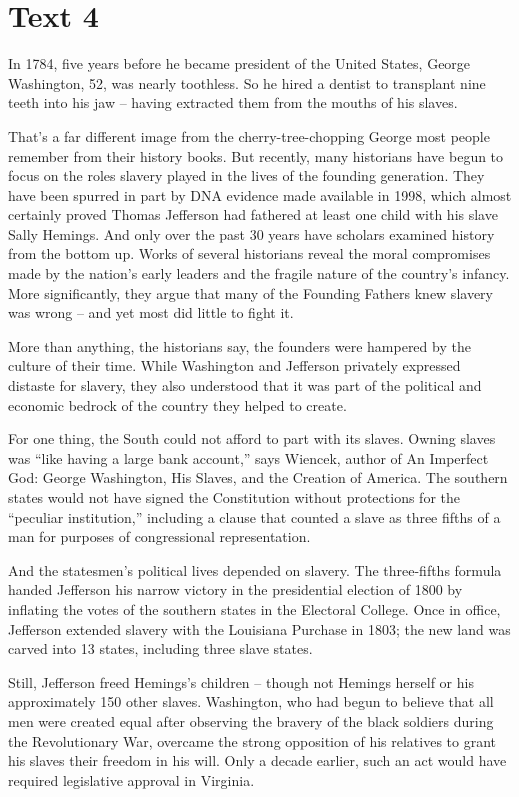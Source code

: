\documentclass[a4paper]{ctexart}
\begin{document}
\section{Text 4}
In 1784, five years before he became president of the United States, George Washington, 52, was nearly toothless. So he hired a dentist to transplant nine teeth into his jaw – having extracted them from the mouths of his slaves.
\par
That’s a far different image from the cherry-tree-chopping George most people remember from their history books. But recently, many historians have begun to focus on the roles slavery played in the lives of the founding generation. They have been spurred in part by DNA evidence made available in 1998, which almost certainly proved Thomas Jefferson had fathered at least one child with his slave Sally Hemings. And only over the past 30 years have scholars examined history from the bottom up. Works of several historians reveal the moral compromises made by the nation’s early leaders and the fragile nature of the country’s infancy. More significantly, they argue that many of the Founding Fathers knew slavery was wrong – and yet most did little to fight it.
\par
More than anything, the historians say, the founders were hampered by the culture of their time. While Washington and Jefferson privately expressed distaste for slavery, they also understood that it was part of the political and economic bedrock of the country they helped to create.
\par
For one thing, the South could not afford to part with its slaves. Owning slaves was “like having a large bank account,” says Wiencek, author of An Imperfect God: George Washington, His Slaves, and the Creation of America. The southern states would not have signed the Constitution without protections for the “peculiar institution,” including a clause that counted a slave as three fifths of a man for purposes of congressional representation.
\par
And the statesmen’s political lives depended on slavery. The three-fifths formula handed Jefferson his narrow victory in the presidential election of 1800 by inflating the votes of the southern states in the Electoral College. Once in office, Jefferson extended slavery with the Louisiana Purchase in 1803; the new land was carved into 13 states, including three slave states.
\par
Still, Jefferson freed Hemings’s children – though not Hemings herself or his approximately 150 other slaves. Washington, who had begun to believe that all men were created equal after observing the bravery of the black soldiers during the Revolutionary War, overcame the strong opposition of his relatives to grant his slaves their freedom in his will. Only a decade earlier, such an act would have required legislative approval in Virginia.\\
\end{document}
